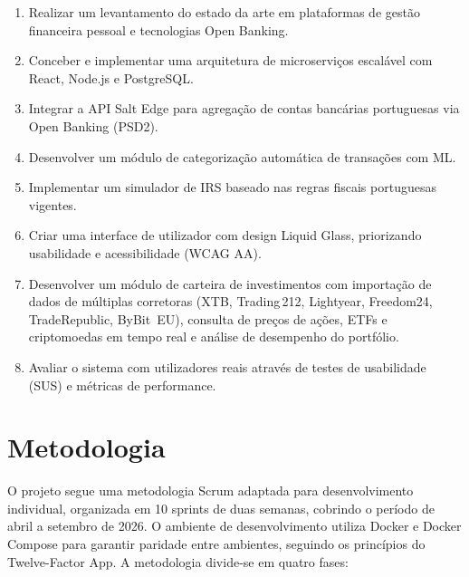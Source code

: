 \begin{enumerate}[label=\textbf{OE\arabic*}]
    \item Realizar um levantamento do estado da arte em plataformas de gestão financeira pessoal e tecnologias Open Banking.
    \item Conceber e implementar uma arquitetura de microserviços escalável com React, Node.js e PostgreSQL.
    \item Integrar a \ac{API} Salt Edge para agregação de contas bancárias portuguesas via Open Banking (\ac{PSD2}).
    \item Desenvolver um módulo de categorização automática de transações com \ac{ML}.
    \item Implementar um simulador de \ac{IRS} baseado nas regras fiscais portuguesas vigentes.
    \item Criar uma interface de utilizador com design Liquid Glass, priorizando usabilidade e acessibilidade (\ac{WCAG} AA).
    \item Desenvolver um módulo de carteira de investimentos com importação de dados de múltiplas corretoras (XTB, Trading\,212, Lightyear, Freedom24, TradeRepublic, ByBit~EU), consulta de preços de ações, ETFs e criptomoedas em tempo real e análise de desempenho do portfólio.
    \item Avaliar o sistema com utilizadores reais através de testes de usabilidade (\ac{SUS}) e métricas de performance.
\end{enumerate}


\section{Metodologia}
\label{sec:metodologia}

O projeto segue uma metodologia Scrum adaptada para desenvolvimento individual, organizada em 10 sprints de duas semanas, cobrindo o período de abril a setembro de 2026. O ambiente de desenvolvimento utiliza Docker e Docker Compose para garantir paridade entre ambientes, seguindo os princípios do Twelve-Factor App. A metodologia divide-se em quatro fases:

